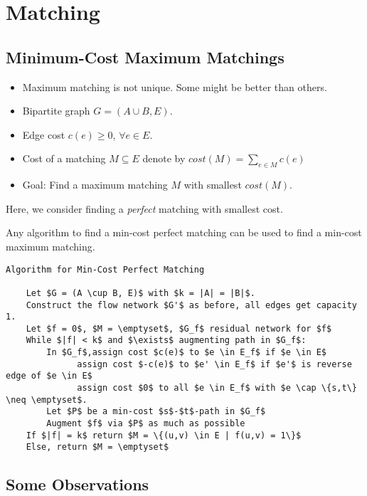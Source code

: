 \section{Matching}

\subsection{Minimum-Cost Maximum Matchings}

\begin{itemize}
\item Maximum matching is not unique. Some might be better than others.
\item Bipartite graph $G = (A \cup B, E)$.
\item Edge cost $c(e) \ge 0$, $\forall e \in E$.
\item Cost of a matching $M \subseteq E$ denote by ${cost}(M) = \sum_{e\in M} c(e)$
\item Goal: Find a maximum matching $M$ with smallest ${cost}(M)$. 
\end{itemize}

Here, we consider finding a \emph{perfect} matching with smallest cost.

\begin{mylemma}
Any algorithm to find a min-cost perfect matching can be used to find a min-cost maximum matching.
\end{mylemma}

\begin{lstlisting}[mathescape]
Algorithm for Min-Cost Perfect Matching

    Let $G = (A \cup B, E)$ with $k = |A| = |B|$.
    Construct the flow network $G'$ as before, all edges get capacity 1.
    Let $f = 0$, $M = \emptyset$, $G_f$ residual network for $f$
    While $|f| < k$ and $\exists$ augmenting path in $G_f$:
        In $G_f$,assign cost $c(e)$ to $e \in E_f$ if $e \in E$
              assign cost $-c(e)$ to $e' \in E_f$ if $e'$ is reverse edge of $e \in E$
              assign cost $0$ to all $e \in E_f$ with $e \cap \{s,t\} \neq \emptyset$.
        Let $P$ be a min-cost $s$-$t$-path in $G_f$
        Augment $f$ via $P$ as much as possible
    If $|f| = k$ return $M = \{(u,v) \in E | f(u,v) = 1\}$
    Else, return $M = \emptyset$
\end{lstlisting}

\subsection{Some Observations}

